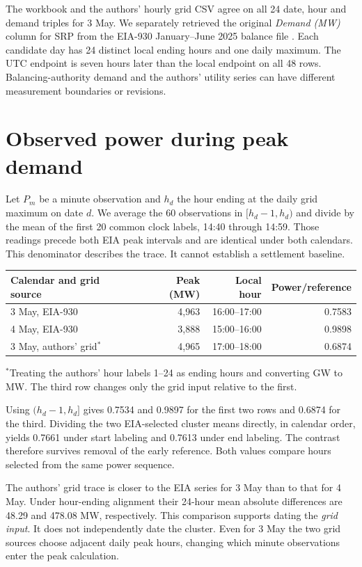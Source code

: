 \documentclass[11pt]{article}
\begin{document}
The workbook and the authors' hourly grid CSV agree on all 24 date, hour and demand triples for 3 May. We separately retrieved the original \emph{Demand (MW)} column for SRP from the EIA-930 January--June 2025 balance file \cite{eia}. Each candidate day has 24 distinct local ending hours and one daily maximum. The UTC endpoint is seven hours later than the local endpoint on all 48 rows. Balancing-authority demand and the authors' utility series can have different measurement boundaries or revisions.

\section{Observed power during peak demand}
Let $P_m$ be a minute observation and $h_d$ the hour ending at the daily grid maximum on date $d$. We average the 60 observations in $[h_d-1,h_d)$ and divide by the mean of the first 20 common clock labels, 14:40 through 14:59. Those readings precede both EIA peak intervals and are identical under both calendars. This denominator describes the trace. It cannot establish a settlement baseline.

\begin{center}
\begin{tabular}{lrrr}\toprule
Calendar and grid source & Peak (MW) & Local hour & Power/reference\\\midrule
3 May, EIA-930 & 4,963 & 16:00--17:00 & 0.7583\\
4 May, EIA-930 & 3,888 & 15:00--16:00 & 0.9898\\
3 May, authors' grid$^*$ & 4,965 & 17:00--18:00 & 0.6874\\\bottomrule
\end{tabular}
\end{center}
\noindent $^*$Treating the authors' hour labels 1--24 as ending hours and converting GW to MW. The third row changes only the grid input relative to the first.

Using $(h_d-1,h_d]$ gives 0.7534 and 0.9897 for the first two rows and 0.6874 for the third. Dividing the two EIA-selected cluster means directly, in calendar order, yields 0.7661 under start labeling and 0.7613 under end labeling. The contrast therefore survives removal of the early reference. Both values compare hours selected from the same power sequence.

The authors' grid trace is closer to the EIA series for 3 May than to that for 4 May. Under hour-ending alignment their 24-hour mean absolute differences are 48.29 and 478.08 MW, respectively. This comparison supports dating the \emph{grid input}. It does not independently date the cluster. Even for 3 May the two grid sources choose adjacent daily peak hours, changing which minute observations enter the peak calculation.
\end{document}
